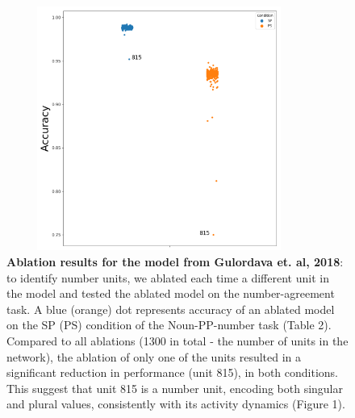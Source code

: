 
	



\newcommand{\beginsupplement}{%
        \setcounter{table}{0}
        \renewcommand{\thetable}{S\arabic{table}}%
        \setcounter{figure}{0}
        \renewcommand{\thefigure}{S\arabic{figure}}%
     }



\beginsupplement

\begin{figure}[b]
    \centering
    \includegraphics[width=10cm, height=8cm]{figures/SM/Ablation_results_K_model.png}
    \caption{\textbf{Ablation results for the model from Gulordava et. al, 2018}: to identify number units, we ablated each time a different unit in the model and tested the ablated model on the number-agreement task. A blue (orange) dot represents accuracy of an ablated model on the SP (PS) condition of the Noun-PP-number task (Table 2). Compared to all ablations (1300 in total - the number of units in the network), the ablation of only one of the units resulted in a significant reduction in performance (unit 815), in both conditions. This suggest that unit 815 is a number unit, encoding both singular and plural values, consistently with its activity dynamics (Figure 1).}
    \label{fig:ablation_K_model}
\end{figure}

